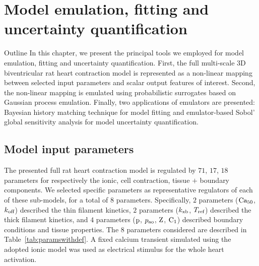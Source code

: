 \chapter{Model emulation, fitting and uncertainty 
quantification}\label{cha:chapter3}
%
%
%
\begin{remark}{Outline}
    In this chapter, we present the principal tools we employed for model emulation, fitting and uncertainty quantification. First, the full multi-scale $3$D biventricular rat heart contraction model is represented as a non-linear mapping between selected input parameters and scalar output features of interest. Second, the non-linear mapping is emulated using probabilistic surrogates based on Gaussian process emulation. Finally, two applications of emulators are presented: Bayesian history matching technique for model fitting and emulator-based Sobol' global sensitivity analysis for model uncertainty quantification. 
\end{remark}


%
%
%
\section{Model input parameters}\label{sec:ch3modelinputparameters}
The presented full rat heart contraction model is regulated by $71$, $17$, $18$ parameters for respectively the ionic, cell contraction, tissue $+$ boundary components. We selected specific parameters as representative regulators of each of these sub-models, for a total of $8$ parameters. Specifically, $2$ parameters ($\textrm{Ca}_{50}$, $k_{\textrm{off}}$) described the thin filament kinetics, $2$ parameters ($k_{\textrm{xb}}$, $T_{\textrm{ref}}$) described the thick filament kinetics, and $4$ parameters ($\textrm{p}$, $p_{\textrm{ao}}$, $\textrm{Z}$, $\textrm{C}_1$) described boundary conditions and tissue properties. The $8$ parameters considered are described in Table~\ref{tab:paramswithdef}. A fixed calcium transient simulated using the adopted ionic model was used as electrical stimulus for the whole heart activation.


